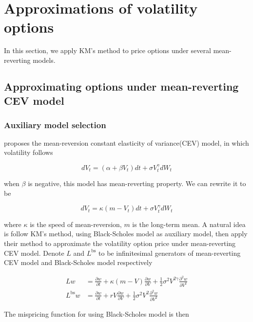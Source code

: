 \chapter{Approximations of volatility options}\label{ch3}

In this section, we apply KM's method to price options under several mean-reverting models.

\section{Approximating options under mean-reverting CEV model}
\label{sec: 3.1}

\subsection{Auxiliary model selection}

\cite{chan_empirical_1992} proposes the mean-reversion constant elasticity of variance(CEV) model, in which volatility follows

$$
    d V_{t}=\left(\alpha+\beta V_{t}\right) d t+\sigma V_{t}^{\gamma} d W_{t}
$$

\noindent when $\beta$ is negative, this model has mean-reverting property. We can rewrite it to be

\begin{equation}\label{mr}
    d V_t=\kappa(m - V_t) d t+\sigma V^{\gamma}_t d W_t
\end{equation}

\noindent where $\kappa$ is the speed of mean-reversion, $m$ is the long-term mean. A natural idea is follow KM's method, using Black-Scholes model as auxiliary model, then apply their method to approximate the volatility option price under mean-reverting CEV model. Denote $L$ and $L^{\text{bs}}$ to be infinitesimal generators of mean-reverting CEV model and Black-Scholes model respectively

$$
\begin{aligned}
    L w&= \frac{\partial w}{\partial t}+\kappa(m - V) \frac{\partial w}{\partial V}+\frac{1}{2} \sigma^{2} V^{2\gamma} \frac{\partial^{2} w}{\partial V^{2}} \\
    L^{\text{bs}} w &= \frac{\partial w}{\partial t}+rV \frac{\partial w}{\partial V}+\frac{1}{2} \sigma^{2} V^2 \frac{\partial^{2} w}{\partial V^{2}}
\end{aligned}
$$

\noindent The mispricing function for using Black-Scholes model is then

